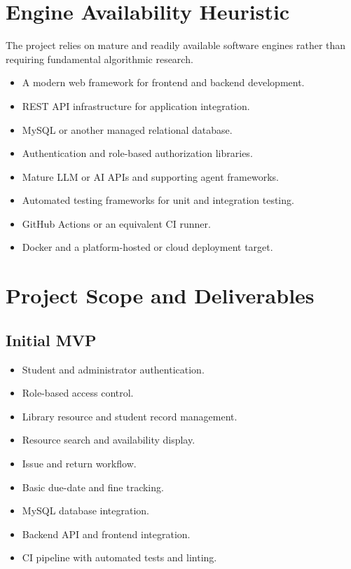 \documentclass[11pt,a4paper]{article}
\begin{document}
\section{Engine Availability Heuristic}
The project relies on mature and readily available software engines rather than requiring fundamental algorithmic research.
\begin{itemize}
    \item A modern web framework for frontend and backend development.
    \item REST API infrastructure for application integration.
    \item MySQL or another managed relational database.
    \item Authentication and role-based authorization libraries.
    \item Mature LLM or AI APIs and supporting agent frameworks.
    \item Automated testing frameworks for unit and integration testing.
    \item GitHub Actions or an equivalent CI runner.
    \item Docker and a platform-hosted or cloud deployment target.
\end{itemize}

\section{Project Scope and Deliverables}
\subsection{Initial MVP}
\begin{itemize}
    \item Student and administrator authentication.
    \item Role-based access control.
    \item Library resource and student record management.
    \item Resource search and availability display.
    \item Issue and return workflow.
    \item Basic due-date and fine tracking.
    \item MySQL database integration.
    \item Backend API and frontend integration.
    \item CI pipeline with automated tests and linting.
\end{itemize}
\end{document}
